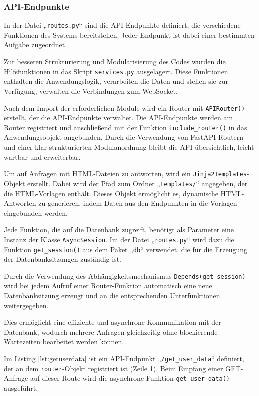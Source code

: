 \documentclass[12pt, letterpaper]{article}
\begin{document}
  \subsubsection{API-Endpunkte}
  \par In der Datei „\texttt{routes.py}“ sind die API-Endpunkte definiert, die verschiedene Funktionen des Systems bereitstellen. Jeder Endpunkt ist dabei einer bestimmten Aufgabe zugeordnet. 
  \par Zur besseren Strukturierung und Modularisierung des Codes wurden die Hilfsfunktionen in das Skript \texttt{services.py} ausgelagert. Diese Funktionen enthalten die Anwendungslogik, verarbeiten die Daten und stellen sie zur Verfügung, verwalten die Verbindungen zum WebSocket.
  \par Nach dem Import der erforderlichen Module wird ein Router mit \texttt{APIRouter()} erstellt, der die API-Endpunkte verwaltet. Die API-Endpunkte werden am Router registriert und anschließend mit der Funktion \texttt{include\_router()} in das Anwendungsobjekt angebunden. Durch die Verwendung von FastAPI-Routern und einer klar strukturierten Modulanordnung bleibt die API übersichtlich, leicht wartbar und erweiterbar.
  \par Um auf Anfragen mit HTML-Dateien zu antworten, wird ein \texttt{Jinja2Templates}-Objekt erstellt. Dabei wird der Pfad zum Ordner „\texttt{templates/}“ angegeben, der die HTML-Vorlagen enthält. Dieses Objekt ermöglicht es, dynamische HTML-Antworten zu generieren, indem Daten aus den Endpunkten in die Vorlagen eingebunden werden.
  \par Jede Funktion, die auf die Datenbank zugreift, benötigt als Parameter eine Instanz der Klasse \texttt{AsyncSession}. Im der Datei „\texttt{routes.py}“ wird dazu die Funktion \texttt{get\_session()} aus dem Paket „\texttt{db}“ verwendet, die für die Erzeugung der Datenbanksitzungen zuständig ist. 
  \par Durch die Verwendung des Abhängigkeitsmechanismus \texttt{Depends(get\_session)} wird bei jedem Aufruf einer Router-Funktion automatisch eine neue Datenbanksitzung erzeugt und an die entsprechenden Unterfunktionen weitergegeben. 
  \par Dies ermöglicht eine effiziente und asynchrone Kommunikation mit der Datenbank, wodurch mehrere Anfragen gleichzeitig ohne blockierende Wartezeiten bearbeitet werden können.
  \par Im Listing \ref{lst:getuserdata} ist ein API-Endpunkt „\texttt{/get\_user\_data}“ definiert, der an dem \texttt{router}-Objekt registriert ist (Zeile 1). Beim Empfang einer GET-Anfrage auf dieser Route wird die asynchrone Funktion \texttt{get\_user\_data()} ausgeführt.
\end{document}
